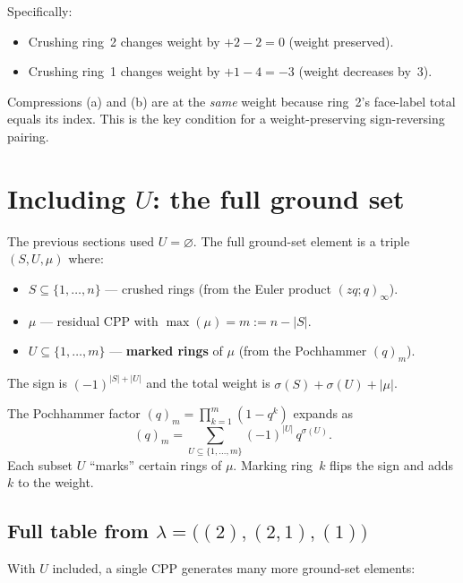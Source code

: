 \documentclass[11pt]{article}
\begin{document}
\medskip\noindent
Specifically:
\begin{itemize}
  \item Crushing ring~2 changes weight by
    $+2 - 2 = 0$ (weight preserved).
  \item Crushing ring~1 changes weight by
    $+1 - 4 = -3$ (weight decreases by~3).
\end{itemize}

\noindent
Compressions (a) and (b) are at the \emph{same} weight
because ring~2's face-label total equals its index.
This is the key condition for a weight-preserving
sign-reversing pairing.


\section{Including $U$: the full ground set}

The previous sections used $U = \varnothing$.  The full
ground-set element is a triple $(S, U, \mu)$ where:
\begin{itemize}
  \item $S \subseteq \{1, \ldots, n\}$ --- crushed rings
    (from the Euler product $(zq;q)_\infty$).
  \item $\mu$ --- residual CPP with $\max(\mu) = m := n - |S|$.
  \item $U \subseteq \{1, \ldots, m\}$ --- \textbf{marked rings}
    of $\mu$ (from the Pochhammer $(q)_m$).
\end{itemize}
The sign is $(-1)^{|S| + |U|}$ and the total weight is
$\sigma(S) + \sigma(U) + |\mu|$.

\medskip\noindent
The Pochhammer factor
$(q)_m = \prod_{k=1}^{m}(1 - q^k)$
expands as
\[
  (q)_m = \sum_{U \subseteq \{1,\ldots,m\}} (-1)^{|U|}\, q^{\sigma(U)}.
\]
Each subset $U$ ``marks'' certain rings of $\mu$.
Marking ring~$k$ flips the sign and adds $k$ to the weight.


\subsection*{Full table from $\lambda = \bigl((2),(2,1),(1)\bigr)$}

With $U$ included, a single CPP generates many more
ground-set elements:
\end{document}

